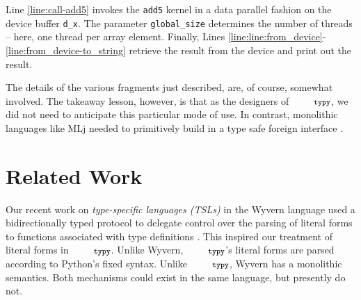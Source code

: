 \documentclass[10pt]{sigplanconf}
\newcommand{\typy}{\texttt{\footnotesize typy}}
\newcommand{\lip}[1]{\lstinline[language=Python,basicstyle=\ttfamily\footnotesize,morekeywords={with},deletendkeywords={tuple,buffer,map}]{#1}}
\newcommand{\li}[1]{\lip{#1}}
\begin{document}
Line \ref{line:call-add5} invokes the \li{add5} kernel in a data parallel fashion on the device buffer \li{d_x}. The parameter \li{global_size} determines the number of threads -- here, one thread per array element. Finally, Lines \ref{line:line:from_device}-\ref{line:from_device-to_string} retrieve the result from the device and print out the result.

The details of the various fragments just described, are, of course, somewhat involved. The takeaway lesson, however, is that as the designers of $\typy$, we did not need to anticipate this particular mode of use. 
In contrast, monolithic languages like MLj needed to primitively build in a type safe foreign interface \cite{Benton:1999:IWW:317636.317791}. %

\section{Related Work}\label{related}\label{sec:related-work}

%




Our recent work on \emph{type-specific languages (TSLs)} in the Wyvern language used a bidirectionally typed protocol to delegate control over the parsing of literal forms to functions associated with type definitions \cite{TSLs}. This inspired our treatment of literal forms in $\typy$. Unlike Wyvern, $\typy$'s literal forms are parsed according to Python's fixed syntax. Unlike $\typy$, Wyvern has a monolithic semantics. Both mechanisms could exist in the same language, but presently do not. %
\end{document}
